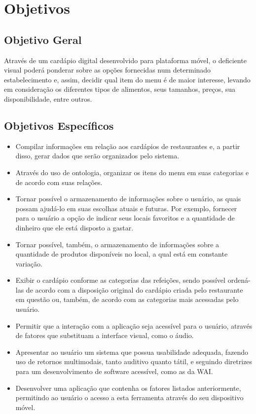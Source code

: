 \chapter{\label{chap:objet}Objetivos}

\section{Objetivo Geral}
Através de um cardápio digital desenvolvido para plataforma móvel, o deficiente visual poderá ponderar sobre as opções fornecidas num determinado estabelecimento e, assim, decidir qual item do menu é de maior interesse, levando em consideração os diferentes tipos de alimentos, seus tamanhos, preços, sua disponibilidade, entre outros. 

\section{Objetivos Específicos}
\begin{itemize}
    \item Compilar informações em relação aos cardápios de restaurantes e, a partir disso, gerar dados que serão organizados pelo sistema.
    \item Através do uso de ontologia, organizar os itens do menu em suas categorias e de acordo com suas relações.
    \item Tornar possível o armazenamento de informações sobre o usuário, as quais possam ajudá-lo em suas escolhas atuais e futuras. Por exemplo, fornecer para o usuário a opção de indicar seus locais favoritos e a quantidade de dinheiro que ele está disposto a gastar.
    \item Tornar possível, também, o armazenamento de informações sobre a quantidade de produtos disponíveis no local, a qual está em constante variação.
    \item Exibir o cardápio conforme as categorias das refeições, sendo possível ordená-las de acordo com a disposição original do cardápio criada pelo restaurante em questão ou, também, de acordo com as categorias mais acessadas pelo usuário.
    \item Permitir que a interação com a aplicação seja acessível para o usuário, através de fatores que substituam a interface visual, como o áudio.
    \item Apresentar ao usuário um sistema que possua usabilidade adequada, fazendo uso de retornos multimodais, tanto auditivo quanto tátil, e seguindo diretrizes para um desenvolvimento de software acessível, como as da WAI.
    \item Desenvolver uma aplicação que contenha os fatores listados anteriormente, permitindo ao usuário o acesso a esta ferramenta através do seu dispositivo móvel.
\end{itemize}